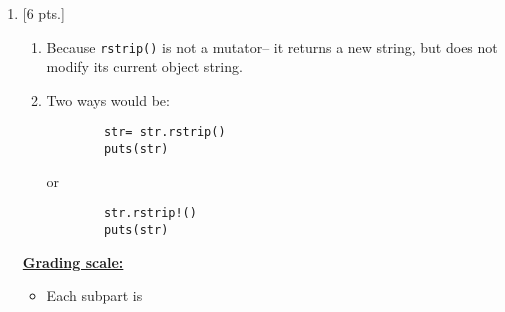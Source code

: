 \documentclass[11pt,fleqn]{article}
\begin{document}
  \begin{enumerate}

    \addtolength{\itemsep}{8mm}

    \item {[6 pts.]}

          \vspace{-2.5mm}

          \begin{enumerate}

            \addtolength{\itemsep}{2mm}

            \item Because \texttt{rstrip()} is not a mutator-- it returns a
                  new string, but does not modify its current object string.

            \item Two ways would be:

                  \vspace{-2.5mm}

                  \begin{multicols}{3}

                    \begin{Verbatim}
        str= str.rstrip()
        puts(str)
                    \end{Verbatim}

                    \columnbreak

                    \centering or

                    \columnbreak

                    \begin{Verbatim}
        str.rstrip!()
        puts(str)
                    \end{Verbatim}

                  \end{multicols}

          \end{enumerate}

          \vspace{-2.5mm}

          \begin{info}{\textbf{\underline{Grading scale:}}}

            \begin{itemize}

              \addtolength{\itemsep}{2mm}

              \item Each subpart is 


\end{itemize}
\end{info}
\end{enumerate}
\end{document}
